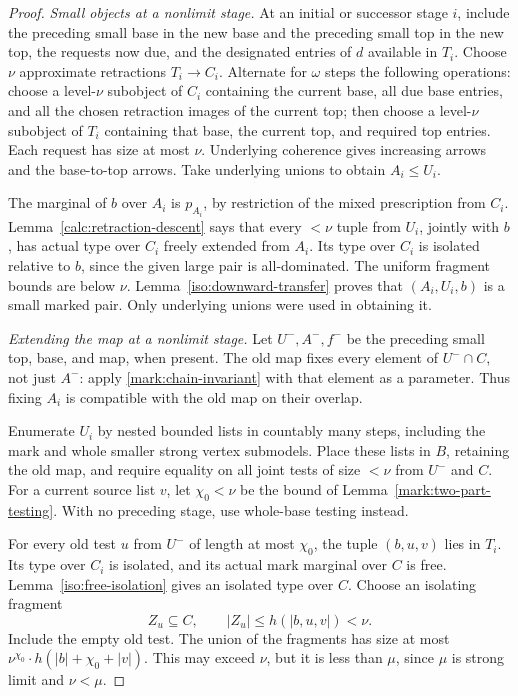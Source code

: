 \begin{proof}
\par\medskip\noindent\textit{Small objects at a nonlimit stage.}\quad
At an initial or successor stage \(i\),
include the preceding small base
in the new base and the preceding
small top in the new top,
the requests now due, and the designated
entries of \(d\) available in \(T_i\).
Choose \(\nu\) approximate retractions
\(T_i\to C_i\).  Alternate for \(\omega\)
steps the following operations: choose
a level-\(\nu\) subobject of \(C_i\)
containing the current base, all due
base entries, and all the chosen
retraction images of the current top;
then choose a level-\(\nu\) subobject
of \(T_i\) containing that base, the
current top, and required top entries.
Each request has size at most \(\nu\).
Underlying coherence gives increasing
arrows and the base-to-top arrows.
Take underlying unions to obtain
\(A_i\leq U_i\).

The marginal of \(b\) over \(A_i\)
is \(p_{A_i}\), by restriction of the
mixed prescription from \(C_i\).
Lemma~\ref{calc:retraction-descent}
says that every \(<\nu\) tuple from
\(U_i\), jointly with \(b\), has
actual type over \(C_i\) freely
extended from \(A_i\).  Its type
over \(C_i\) is isolated relative
to \(b\), since the given large
pair is all-dominated.  The uniform
fragment bounds are below \(\nu\).
Lemma~\ref{iso:downward-transfer}
proves that \((A_i,U_i,b)\) is a
small marked pair.  Only underlying
unions were used in obtaining it.

\par\medskip\noindent\textit{Extending the map at a nonlimit stage.}\quad
Let \(U^-,A^-,f^-\) be the preceding
small top, base, and map, when present.
The old map fixes every element of
\(U^-\cap C\), not just \(A^-\):
apply \eqref{mark:chain-invariant}
with that element as a parameter.
Thus fixing \(A_i\) is compatible
with the old map on their overlap.

Enumerate \(U_i\) by nested bounded
lists in countably many steps,
including the mark and whole
smaller strong vertex submodels.
Place these lists in \(B\), retaining
the old map, and require equality
on all joint tests of size \(<\nu\)
from \(U^-\) and \(C\).  For a
current source list \(v\), let
\(\chi_0<\nu\) be the bound of
Lemma~\ref{mark:two-part-testing}.
With no preceding stage, use
whole-base testing instead.

For every old test \(u\) from
\(U^-\) of length at most \(\chi_0\),
the tuple \((b,u,v)\) lies in \(T_i\).
Its type over \(C_i\) is isolated,
and its actual mark marginal over
\(C\) is free.  Lemma~\ref{iso:free-isolation}
gives an isolated type over \(C\).
Choose an isolating fragment
\[
              Z_u\subseteq C,\qquad
              |Z_u|\leq h(|b,u,v|)<\nu .
\]
Include the empty old test.  The
union of the fragments has size
at most
\(\nu^{\chi_0}\cdot h(|b|+\chi_0+|v|)\).
This may exceed \(\nu\), but it
is less than \(\mu\), since \(\mu\)
is strong limit and \(\nu<\mu\).


\end{proof}
